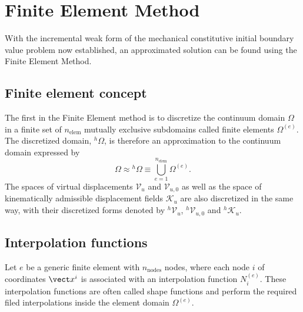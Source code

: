 \section{Finite Element Method} \label{sec:fem_mech}

With the incremental weak form of the mechanical constitutive initial boundary value problem now established, an approximated solution can be found using the Finite Element Method.

\subsection{Finite element concept}

The first in the Finite Element method is to discretize the continuum domain $\Omega$ in a finite set of $n_\text{elem}$ mutually exclusive subdomains called finite elements $\Omega^{(e)}$.
The discretized domain, $^h\Omega$, is therefore an approximation to the continuum domain expressed by
\begin{equation}
    \Omega \approx {}^h\Omega \equiv \bigcup_{e=1}^{n_\text{elem}}\Omega^{(e)}.
\end{equation}
The spaces of virtual displacements $\mathscr{V}_u$ and \(\mathscr V_{u,0}\) as well as the space of kinematically admissible displacement fields $\mathscr{K}_u$ are also discretized in the same way, with their discretized forms denoted by $^h\mathscr{V}_u$, \(^h\mathscr{V}_{u,0}\) and $^h\mathscr{K}_u$.

\subsection{Interpolation functions}

Let $e$ be a generic finite element with $n_\text{nodes}$ nodes, where each node $i$ of coordinates $\vect x^i$ is associated with an interpolation function $N_i^{(e)}$.
These interpolation functions are often called shape functions and perform the required filed interpolations inside the element domain $\Omega^{(e)}$.

